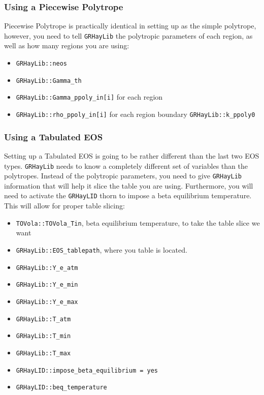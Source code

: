 \subsubsection{Using a Piecewise Polytrope}

Piecewise Polytrope is practically identical in setting up as the simple polytrope, however, you need to tell \texttt{GRHayLib} the polytropic parameters of each region, as well as how many regions you are using:

\begin{itemize}
    \item \texttt{GRHayLib::neos}
    \item \texttt{GRHayLib::Gamma\_th}
    \item \texttt{GRHayLib::Gamma\_ppoly\_in[i]} for each region
    \item \texttt{GRHayLib::rho\_ppoly\_in[i]} for each region boundary
    \teun \texttt{GRHayLib::k\_ppoly0}
\end{itemize}

\subsubsection{Using a Tabulated EOS}

Setting up a Tabulated EOS is going to be rather different than the last two EOS types. \texttt{GRHayLib} needs to know a completely different set of variables than the polytropes. Instead of the polytropic parameters, you need to give \texttt{GRHayLib} information that will help it slice the table you are using. Furthermore, you will need to activate the \texttt{GRHayLID} thorn to impose a beta equilibrium temperature. This will allow for proper table slicing:

\begin{itemize}
    \item \texttt{TOVola::TOVola\_Tin}, beta equilibrium temperature, to take the table slice we want
    \item \texttt{GRHayLib::EOS\_tablepath}, where you table is located.
    \item \texttt{GRHayLib::Y\_e\_atm}
    \item \texttt{GRHayLib::Y\_e\_min}
    \item \texttt{GRHayLib::Y\_e\_max}
    \item \texttt{GRHayLib::T\_atm}
    \item \texttt{GRHayLib::T\_min}
    \item \texttt{GRHayLib::T\_max}
    \item \texttt{GRHayLID::impose\_beta\_equilibrium = yes}
    \item \texttt{GRHayLID::beq\_temperature}
\end{itemize}

